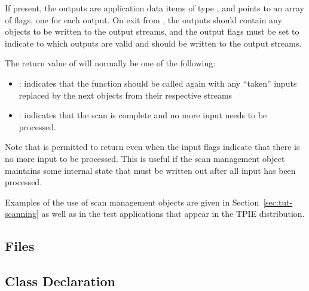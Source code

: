     If present, the outputs  are
    application data items of type , and
     points to an array of flags, one for each
    output. On exit from , the outputs
    should contain any objects to be written to the output
    streams, and the output flags must be set to indicate to
     which outputs are valid and should
    be written to the output streams.
    
    The return value of  will normally be
    one of the following:
    \begin{itemize}
        \item {}:
         indicates that
        the function should be called again with any
        ``taken'' inputs replaced by the next objects from
        their respective streams
        \item {}: 
        indicates that the
        scan is complete and no more input needs to be
        processed.
    \end{itemize}
    
    Note that  is permitted to return
     even when the input flags
    indicate that there is no more input to be processed.
    This is useful if the scan management object maintains
    some internal state that must be written out after all
    input has been processed.  


Examples of the use of scan management objects are given in
Section~\ref{sec:tut-scanning} as well as in the test applications that
appear in the TPIE distribution.




\subsection{Files}
  \btabb
     {}
  \etabb


\subsection{Class Declaration}
  \btabb
     {}
  \etabb

